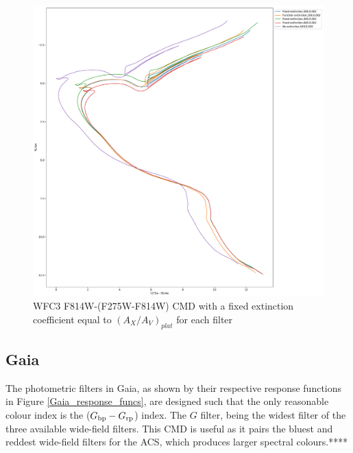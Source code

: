 \documentclass[12pt, a4paper]{report}
\begin{document}
\begin{figure}[h]
\begin{center}
\includegraphics[scale=0.3]{../basti_isochrones_10_13Gyr/Extinction_T50k_FeH0fix_func_f814w_f275wmf814w_500_400_600_Myr_FeH_0p002_ref_noext_Av_1p0.pdf}
\caption{WFC3 F814W-(F275W-F814W) CMD with a fixed extinction coefficient equal to $(A_{X}/A_{V})_{plat}$ for each filter}
\label{wfc3_isoc2_T50k}
\end{center}
\end{figure}

\subsection{Gaia} \label{Gaia_isoc}

The photometric filters in Gaia, as shown by their respective response functions in Figure \ref{Gaia_response_funcs}, are designed such that the only reasonable colour index is the ($G_{\textnormal{bp}}-G_{\textnormal{rp}}$) index. The $G$ filter, being the widest filter of the three available wide-field filters. This CMD is useful as it pairs the bluest and reddest wide-field filters for the ACS, which produces larger spectral colours.****
\end{document}
